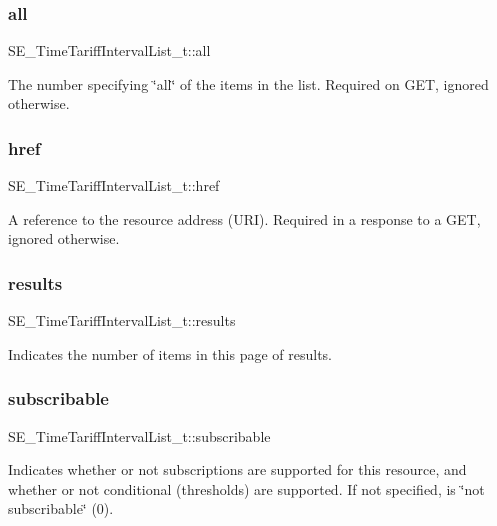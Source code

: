 \subsubsection{\texorpdfstring{all}{all}}
{\footnotesize\ttfamily S\+E\+\_\+\+Time\+Tariff\+Interval\+List\+\_\+t\+::all}

The number specifying \char`\"{}all\char`\"{} of the items in the list. Required on G\+ET, ignored otherwise. \mbox{\label{group__TimeTariffIntervalList_ga371ed4352ff21e9f24d404ff0e9f81b6}} 
\subsubsection{\texorpdfstring{href}{href}}
{\footnotesize\ttfamily S\+E\+\_\+\+Time\+Tariff\+Interval\+List\+\_\+t\+::href}

A reference to the resource address (U\+RI). Required in a response to a G\+ET, ignored otherwise. \mbox{\label{group__TimeTariffIntervalList_ga46a856a44a08a8467dc3927024765e11}} 
\subsubsection{\texorpdfstring{results}{results}}
{\footnotesize\ttfamily S\+E\+\_\+\+Time\+Tariff\+Interval\+List\+\_\+t\+::results}

Indicates the number of items in this page of results. \mbox{\label{group__TimeTariffIntervalList_ga1a55fc782a58ffbef307e3bae8f43f6c}} 
\subsubsection{\texorpdfstring{subscribable}{subscribable}}
{\footnotesize\ttfamily S\+E\+\_\+\+Time\+Tariff\+Interval\+List\+\_\+t\+::subscribable}

Indicates whether or not subscriptions are supported for this resource, and whether or not conditional (thresholds) are supported. If not specified, is \char`\"{}not subscribable\char`\"{} (0). 